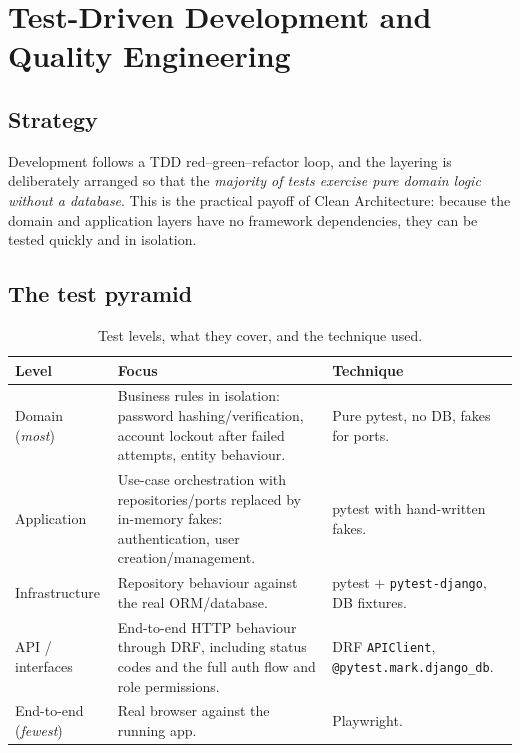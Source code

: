 \documentclass[11pt,a4paper]{article}
\begin{document}
\section{Test-Driven Development and Quality Engineering}
\label{sec:tdd}

\subsection{Strategy}

Development follows a TDD red--green--refactor loop, and the layering is deliberately arranged so
that the \emph{majority of tests exercise pure domain logic without a database}. This is the
practical payoff of Clean Architecture: because the domain and application layers have no framework
dependencies, they can be tested quickly and in isolation.

\subsection{The test pyramid}

\begin{table}[htbp]\centering
\small
\caption{Test levels, what they cover, and the technique used.}
\begin{tabular}{@{}p{}p{}p{}@{}}
\toprule
\textbf{Level} & \textbf{Focus} & \textbf{Technique} \\
\midrule
Domain (\emph{most}) & Business rules in isolation: password hashing/verification, account lockout
after failed attempts, entity behaviour. & Pure pytest, no DB, fakes for ports. \\
Application & Use-case orchestration with repositories/ports replaced by in-memory fakes:
authentication, user creation/management. & pytest with hand-written fakes. \\
Infrastructure & Repository behaviour against the real ORM/database. & pytest + \texttt{pytest-django},
DB fixtures. \\
API / interfaces & End-to-end HTTP behaviour through DRF, including status codes and the full auth
flow and role permissions. & DRF \texttt{APIClient}, \texttt{@pytest.mark.django\_db}. \\
End-to-end (\emph{fewest}) & Real browser against the running app. & Playwright. \\
\bottomrule
\end{tabular}
\end{table}
\end{document}
